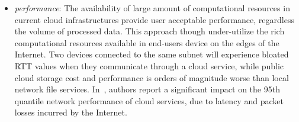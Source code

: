 \begin{itemize}
\item {\it performance}: The availability of large amount of computational
      resources in current cloud infrastructures provide user acceptable
      performance, regardless the volume of processed data.
      This approach though under-utilize the rich computational resources 
      available in 
      end-users device on the edges of the Internet.  Two devices connected to the
      same subnet will experience bloated RTT values when they communicate
      through a cloud service, while public cloud storage cost and performance
      is orders of magnitude worse than local network file services.
      In~\cite{Wittie2010}, authors report a significant impact on the 95th
      quantile network performance of cloud services, due to latency and packet
      losses incurred by the Internet.


\end{itemize}
